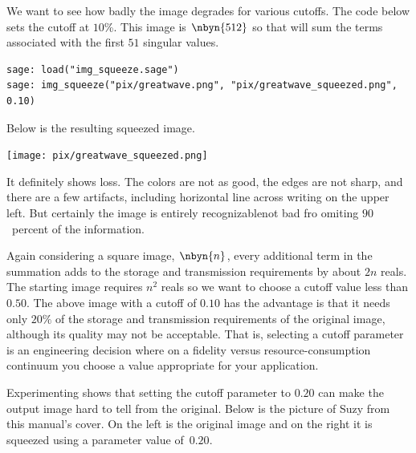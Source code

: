 We want to see how badly the image degrades for various cutoffs.
The code below sets the cutoff at $10$\%.
This image is $\nbyn{512}$ so that will sum the terms associated
with the first $51$ singular 
values.
\begin{lstlisting}
sage: load("img_squeeze.sage")                                 
sage: img_squeeze("pix/greatwave.png", "pix/greatwave_squeezed.png", 0.10)
\end{lstlisting}
Below is the resulting squeezed image.
\begin{center}
  \texttt{[image: pix/greatwave\_squeezed.png]}
\end{center}
It definitely shows loss.
The colors are not as good, the edges are not sharp, and there are 
a few artifacts, including horizontal line across writing on the 
upper left.
But certainly the image is entirely recognizable\Dash not bad fro omiting
$90$~percent of the information.

Again considering a square image, $\nbyn{n}$, 
every additional term in the summation
adds to the storage and transmission requirements by about $2n$ reals.
The starting image requires $n^2$ reals so we want to choose a cutoff value 
less than $0.50$.
The above image with a cutoff of $0.10$ has the advantage is that it needs 
only $20\%$ of the storage
and transmission requirements of the original image,
although its quality may not be acceptable.
That is, selecting a cutoff parameter is an engineering decision where
on a fidelity versus resource-consumption continuum 
you choose a value appropriate for your application.
 
Experimenting shows that setting
the cutoff parameter to $0.20$ can make the output image hard to tell
from the original.
Below is the picture of Suzy 
from this manual's cover.
On the left is the original image
and on the right it is squeezed using a parameter value of~$0.20$.
\begin{center}
  \quad
\end{center}




